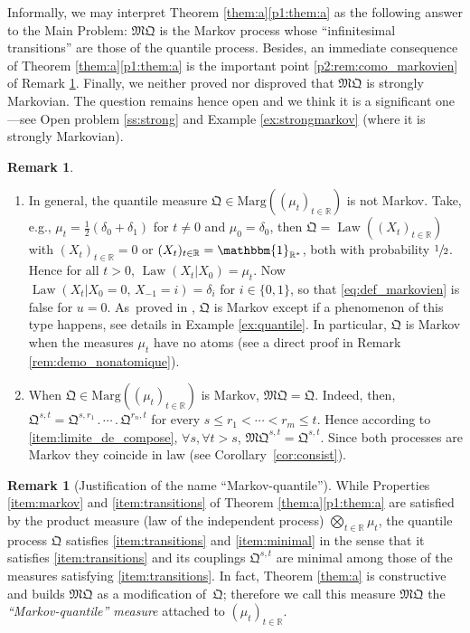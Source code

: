 \documentclass[JEP,XML,SOM,Unicode,NoEqCountersInSection,NoFloatCountersInSection,published]{cedram}
\newcommand{\ldot}{\mathbin{.}}
\newcommand{\lcdots}{\ldot\cdots\ldot}
\theoremstyle{plain}
\theoremstyle{definition}
\newtheorem{rem}[them]{Remark}
\newcommand{\como}{\mathfrak{Q}}
\newcommand{\mq}{\mathfrak{MQ}}
\newcommand{\one}{\mathbbm{1}}
\newcommand{\ma}{\mathrm{Marg}}
\newcommand{\R}{\mathbb{R}}
\newcommand{\law}{\operatorname{Law}}
\begin{document}
Informally, we may interpret Theorem \ref{them:a}\eqref{p1:them:a} as the following answer to the Main Problem: $\mq$ is the Markov process whose ``infinitesimal transitions'' are those of the quantile process. Besides, an immediate consequence of Theorem \ref{them:a}\eqref{p1:them:a} is the important point \eqref{p2:rem:como_markovien} of Remark \ref{rem:como_markovien}. Finally, we neither proved nor disproved that $\mq$ is strongly Markovian. The question remains hence open and we think it is a significant one---see Open problem \ref{ss:strong} and Example \ref{ex:strongmarkov} (where it is strongly Markovian).

\skpt
\begin{rem}\label{rem:como_markovien}
\begin{enumerate}
\item
\label{p1:rem:como_markovien} In general, the quantile measure $\como\in\ma((\mu_t)_{t\in \R})$ is not Markov. Take, e.g., $\mu_t=\frac12(\delta_0+\delta_1)$ for $t\neq0$ and $\mu_0=\delta_0$, then $\como=\law((X_t)_{t\in\R})$ with $(X_t)_{t\in\R}=0$ or $(X_t)_{t\in\R}=\one_{\R^\ast}$, both with probability $\sfrac12$. Hence for all $t>0$, $\law(X_t|X_0)=\mu_t$. Now $\law(X_t|X_0=0,\,X_{-1}=i)=\delta_i$ for $i\in\{0,1\}$, so that \eqref{eq:def_markovien} is false for $u=0$. As~proved in \cite[Prop.\,3]{Ju_seminaire}, $\como$ is Markov except if a phenomenon of this type happens, see details in Example \ref{ex:quantile}.
In particular, $\como$ is Markov when the measures $\mu_t$ have no atoms (see a direct proof in Remark \ref{rem:demo_nonatomique}).

\item\label{p2:rem:como_markovien} When $\como\in\ma((\mu_t)_{t\in \R})$ is Markov, $\mq=\como$. Indeed, then, $\como^{s,t}=\como^{s,r_1}\lcdots \como^{r_n,t}$ for every $s\leq r_1<\cdots<r_m\leq t$. Hence according to \eqref{item:limite_de_compose}, $\forall s, \forall t>s$, $\mq^{s,t}=\como^{s,t}$. Since both processes are Markov they coincide in law (see Corollary~\ref{cor:consist}).
\end{enumerate}
\end{rem}

\begin{rem}[Justification of the name ``Markov-quantile'']While Properties \eqref{item:markov} and \eqref{item:transitions} of Theorem \ref{them:a}\eqref{p1:them:a} are satisfied by the product measure (law of the independent process) $\bigotimes_{t\in \R} \mu_t$, the quantile process $\como$ satisfies \eqref{item:transitions} and \eqref{item:minimal} in the sense that it satisfies \eqref{item:transitions} and its couplings $\como^{s,t}$ are minimal among those of the measures satisfying \eqref{item:transitions}. In fact, Theorem \ref{them:a} is constructive and builds $\mq$ as a modification of~$\como$; therefore we call this measure $\mq$ the \emph{``Markov-quantile'' measure} attached to $(\mu_t)_{t\in\R}$.
\end{rem}
\end{document}
